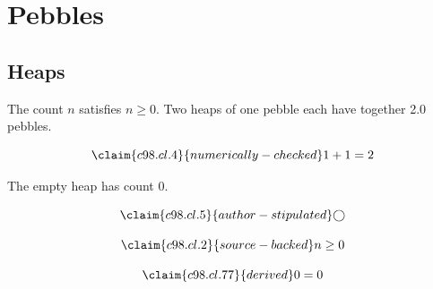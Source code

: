 \chapter{Pebbles}\label{c98}
\section{Heaps}\label{c98.s1}

\begin{theorem}[Count]\label{c98.thm.count}
  The count $n$ satisfies $n \geq 0$.
  Two heaps of one pebble each have together
  \num[c98.cl.4]{2.0}{} pebbles.
\end{theorem}

\begin{equation}\label{c98.eq.sum}\claim{c98.cl.4}{numerically-checked}
  1 + 1 = 2
\end{equation}

\begin{lemma}[Empty]\label{c98.lem.empty}
  The empty heap has count $0$.
\end{lemma}

\begin{equation}\label{c98.eq.circle}\claim{c98.cl.5}{author-stipulated}
  \bigcirc
\end{equation}

\begin{vertiefung}[id=c98.v1, titel={T}, wozu={W}, voraussetzung={V}, zurueck={Z}]
  \begin{equation}\label{c98.eq.page}\claim{c98.cl.2}{source-backed}
    n \geq 0
  \end{equation}
\end{vertiefung}

\begin{equation}\label{c98.eq.x}\claim{c98.cl.77}{derived}
  0 = 0
\end{equation}

